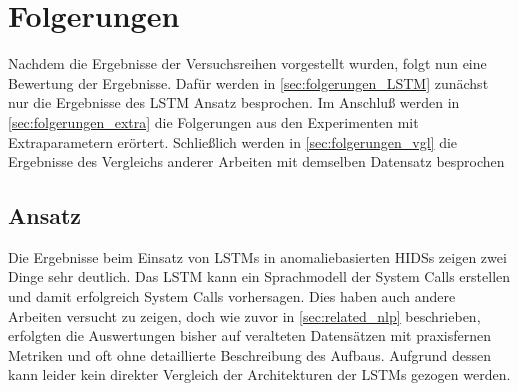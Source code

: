 \chapter{Folgerungen}\label{ch:folgerungen}
Nachdem die Ergebnisse der Versuchsreihen vorgestellt wurden, folgt nun eine Bewertung der Ergebnisse.
Dafür werden in \autoref{sec:folgerungen_LSTM} zunächst nur die Ergebnisse des \ac{LSTM} Ansatz besprochen.
Im Anschluß werden in \autoref{sec:folgerungen_extra} die Folgerungen aus den Experimenten mit Extraparametern erörtert. 
Schließlich werden in \autoref{sec:folgerungen_vgl} die Ergebnisse des Vergleichs anderer Arbeiten mit demselben Datensatz besprochen

\section{ Ansatz}\label{sec:folgerungen_LSTM}

Die Ergebnisse beim Einsatz von \acp{LSTM} in anomaliebasierten \acp{HIDS} zeigen zwei Dinge sehr deutlich.
Das \ac{LSTM} kann ein Sprachmodell der System Calls erstellen und damit erfolgreich System Calls vorhersagen.
Dies haben auch andere Arbeiten versucht zu zeigen, doch wie zuvor in \autoref{sec:related_nlp} beschrieben, erfolgten die Auswertungen bisher auf veralteten Datensätzen mit praxisfernen Metriken und oft ohne detaillierte Beschreibung des Aufbaus.
Aufgrund dessen kann leider kein direkter Vergleich der Architekturen der \acp{LSTM} gezogen werden.\par\medskip

